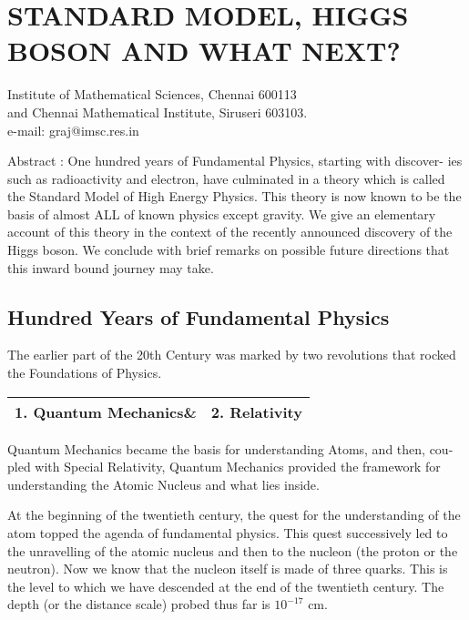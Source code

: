 \chapter[In Memory of Prof.\ G Ramachandran: A tribute]{STANDARD MODEL, HIGGS BOSON AND WHAT NEXT?}\label{chap5}


\begin{center}
Institute of Mathematical Sciences, Chennai 600113\\
and Chennai Mathematical Institute, Siruseri 603103.\\
e-mail: graj@imsc.res.in
\end{center}


Abstract : One hundred years of Fundamental Physics, starting with discover-
ies such as radioactivity and electron, have culminated in a theory which is called
the Standard Model of High Energy Physics. This theory is now known to be the
basis of almost ALL of known physics except gravity. We give an elementary
account of this theory in the context of the recently announced discovery of the
Higgs boson. We conclude with brief remarks on possible future directions that
this inward bound journey may take.


\section*{Hundred Years of Fundamental Physics}

The earlier part of the 20th Century was marked by two revolutions that rocked
the Foundations of Physics.

\begin{tabular}{|cc|}
\hline
1. Quantum Mechanics\& & 2. Relativity\\
\hline 
\end{tabular}

Quantum Mechanics became the basis for understanding Atoms, and then, cou-
pled with Special Relativity, Quantum Mechanics provided the framework for
understanding the Atomic Nucleus and what lies inside.

At the beginning of the twentieth century, the quest for the understanding of
the atom topped the agenda of fundamental physics. This quest successively led
to the unravelling of the atomic nucleus and then to the nucleon (the proton or the
neutron). Now we know that the nucleon itself is made of three quarks. This is the
level to which we have descended at the end of the twentieth century. The depth
(or the distance scale) probed thus far is $10^{-17}$ cm.

